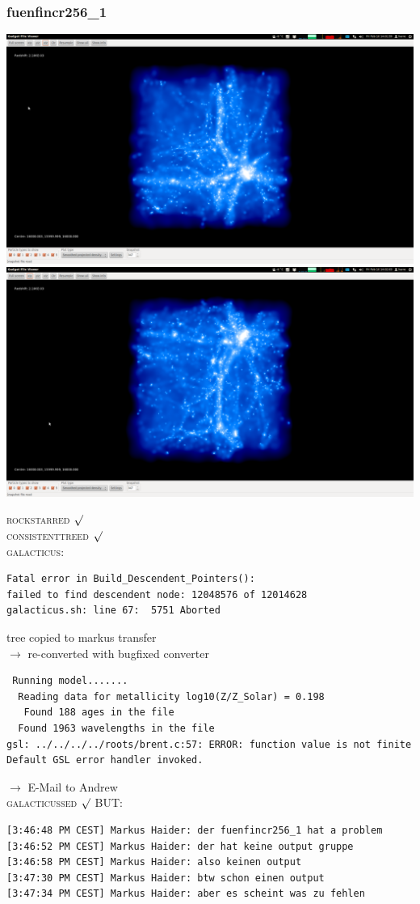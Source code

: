 \documentclass[a4paper,11pt,fleqn,oneside]{book}
\begin{document}
\newpage
\subsubsection{fuenfincr256\_1}

\includegraphics[scale=0.12]{fuenfincr256_1/1.png} 
\includegraphics[scale=0.12]{fuenfincr256_1/2.png}

\textsc{rockstarred} $\surd$ \\ \textsc{consistenttreed} $\surd$
\\ \textsc{galacticus}: 
\begin{verbatim}
Fatal error in Build_Descendent_Pointers():
failed to find descendent node: 12048576 of 12014628
galacticus.sh: line 67:  5751 Aborted  
\end{verbatim}
tree copied to markus transfer \\
$\rightarrow$ re-converted with bugfixed converter \\
\begin{verbatim}
 Running model....... 
  Reading data for metallicity log10(Z/Z_Solar) = 0.198
   Found 188 ages in the file
  Found 1963 wavelengths in the file
gsl: ../../../../roots/brent.c:57: ERROR: function value is not finite
Default GSL error handler invoked.
\end{verbatim}
$\rightarrow$ E-Mail to Andrew \\
\textsc{galacticussed} $\surd$
BUT: 
\begin{verbatim}
[3:46:48 PM CEST] Markus Haider: der fuenfincr256_1 hat a problem
[3:46:52 PM CEST] Markus Haider: der hat keine output gruppe
[3:46:58 PM CEST] Markus Haider: also keinen output
[3:47:30 PM CEST] Markus Haider: btw schon einen output
[3:47:34 PM CEST] Markus Haider: aber es scheint was zu fehlen
\end{verbatim}
\end{document}
